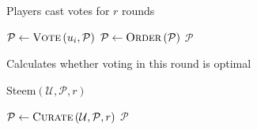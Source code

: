 \begin{algorithm}[H]
  \caption{Players cast votes for $r$ rounds}
  \label{alg:curation}
  \begin{algorithmic}[1]
          \State $\mathcal{P} \leftarrow \textsc{Vote}\left(u_i,
          \mathcal{P}\right)$
        \EndIf
      \EndFor
      \State $\mathcal{P} \leftarrow \textsc{Order}\left(\mathcal{P}\right)$
    \EndFor
    \State \Return $\mathcal{P}$
  \EndFunction
  \end{algorithmic}
\end{algorithm}

\begin{algorithm}[H]
  \caption{Calculates whether voting in this round is optimal}
  \label{alg:isvoteround}
  \begin{algorithmic}[1]
      \State 
    \EndFunction
  \end{algorithmic}
\end{algorithm}

\begin{algorithm}[H]
  \caption{Steem$\left(\mathcal{U}, \mathcal{P}, r\right)$}
  \label{alg:main}
  \begin{algorithmic}[1]
  \State $\mathcal{P} \leftarrow \textsc{Curate}\left(\mathcal{U},
  \mathcal{P}, r\right)$
  \State \Return $\mathcal{P}$
  \end{algorithmic}
\end{algorithm}
